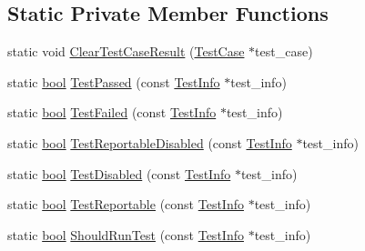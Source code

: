 \subsection*{Static Private Member Functions}
\begin{DoxyCompactItemize}
\item 
static void \hyperlink{classtesting_1_1TestCase_a1c05fe33863b79b1b1ed19e665a1cea7}{Clear\+Test\+Case\+Result} (\hyperlink{classtesting_1_1TestCase}{Test\+Case} $\ast$test\+\_\+case)
\item 
static \hyperlink{classbool}{bool} \hyperlink{classtesting_1_1TestCase_ad8d9e1ebc410000b679002ba71d78686}{Test\+Passed} (const \hyperlink{classtesting_1_1TestInfo}{Test\+Info} $\ast$test\+\_\+info)
\item 
static \hyperlink{classbool}{bool} \hyperlink{classtesting_1_1TestCase_a5922884cb8b4819e869146dc315a1ac1}{Test\+Failed} (const \hyperlink{classtesting_1_1TestInfo}{Test\+Info} $\ast$test\+\_\+info)
\item 
static \hyperlink{classbool}{bool} \hyperlink{classtesting_1_1TestCase_a1f2da5337f941d746dfcb98bc4acc149}{Test\+Reportable\+Disabled} (const \hyperlink{classtesting_1_1TestInfo}{Test\+Info} $\ast$test\+\_\+info)
\item 
static \hyperlink{classbool}{bool} \hyperlink{classtesting_1_1TestCase_a2c6989cdeac01b2153f2e34dca1dbde6}{Test\+Disabled} (const \hyperlink{classtesting_1_1TestInfo}{Test\+Info} $\ast$test\+\_\+info)
\item 
static \hyperlink{classbool}{bool} \hyperlink{classtesting_1_1TestCase_a2c3767df71e07939b32f19ef9c6ed271}{Test\+Reportable} (const \hyperlink{classtesting_1_1TestInfo}{Test\+Info} $\ast$test\+\_\+info)
\item 
static \hyperlink{classbool}{bool} \hyperlink{classtesting_1_1TestCase_a75eb139557c43362f94916cfd6762c94}{Should\+Run\+Test} (const \hyperlink{classtesting_1_1TestInfo}{Test\+Info} $\ast$test\+\_\+info)
\end{DoxyCompactItemize}
